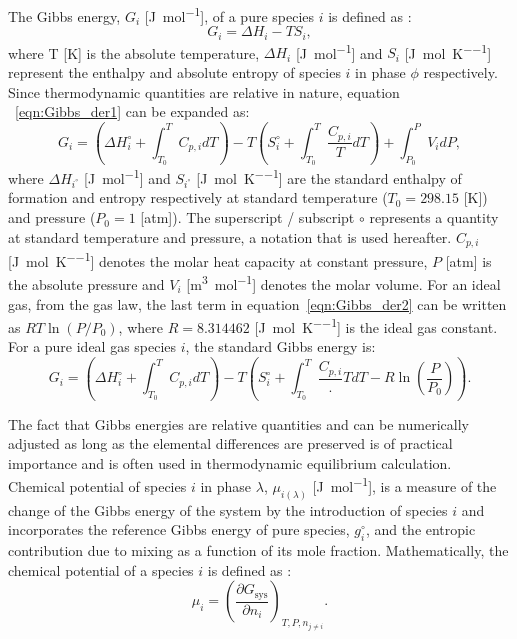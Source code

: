 	The Gibbs energy, $G_{i}$ [\si{\joule \per \mole}], of a pure species  $i$ is defined as \cite{Zemansky81}:
	\begin{equation} \label{eqn:Gibbs_der1}
			G_{i} = \Delta H_{i} - TS_{i},
	\end{equation}
	where T [\si{\kelvin}] is the absolute temperature, $\Delta H_{i}$ [\si{\joule \per \mole}] and $S_{i}$ [\si{\joule \per \mole \per \kelvin}] represent the enthalpy and absolute entropy of species $i$ in phase $\phi$ respectively. Since thermodynamic quantities are relative in nature, equation ~\eqref{eqn:Gibbs_der1} can be expanded as:
	\begin{equation} \label{eqn:Gibbs_der2}
			G_{i} = \left(\Delta H_{i}^\circ + \int_{T_0}^{T} C_{p,i}dT \right) - T\left( S_{i}^\circ  + \int_{T_0}^{T} \frac{C_{p,i}}{T}dT \right) + \int_{P_0}^{P} V_i dP,
	\end{equation}
	where $\Delta H_{i^\circ}$ [\si{\joule \per \mole}] and $S_{i^\circ}$ [\si{\joule \per \mole \per \kelvin}] are the standard enthalpy of formation and entropy respectively at standard temperature ($T_0 = 298.15$ [\si{\kelvin}]) and pressure ($P_0 = 1$ [\si{atm}]). The superscript / subscript $\circ$ represents a quantity at standard temperature and pressure, a notation that is used hereafter. $C_{p,i}$ [\si{\joule \per \mole \per \kelvin}]  denotes the molar heat capacity at constant pressure, $P$ [\si{atm}] is the absolute pressure and $V_i$ [\si{\meter \cubed \per \mole}] denotes the molar volume. For an ideal gas, from the gas law, the last term in equation~\eqref{eqn:Gibbs_der2} can be written as $RT \ln{\left(P/P_0\right)}$, where $R = 8.314462$ [\si{\joule \per \mole \per \kelvin}] is the ideal gas constant. For a pure ideal gas species $i$, the standard Gibbs energy is:
	\begin{equation} \label{eqn:Gibbs_der_id}
			G_{i} = \left(\Delta H_{i}^\circ + \int_{T_0}^{T} C_{p,i}dT \right) - T\left( S_{i}^\circ  + \int_{T_0}^{T} \frac{C_{p,i}}.{T}dT  - R \ln{\left(\frac{P}{P_0}\right)}\right).
	\end{equation}

	The fact that Gibbs energies are relative quantities and can be numerically adjusted as long as the elemental differences are preserved is of practical importance and is often used in thermodynamic equilibrium calculation. Chemical potential of species $i$ in phase $\lambda$, $\mu_{i(\lambda)}$ [\si{\joule \per \mole}], is a measure of the change of the Gibbs energy of the system by the introduction of species $i$ and incorporates  the reference Gibbs energy of pure species, $g_{i}^\circ$, and the entropic contribution due to mixing as a function of its mole fraction. Mathematically, the chemical potential of a species $i$ is defined as \cite{Zemansky81}:
    	\begin{equation}\label{eq:mu_def}
        		\mu_{i} = {\left (\frac{\partial G_\text{sys}}{\partial n_{i}} \right )}_{T,P,n_{j \neq i}}.
    	\end{equation}

